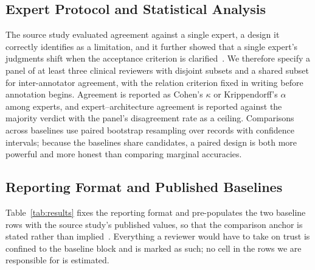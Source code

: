\documentclass[conference]{IEEEtran}
\begin{document}
\subsection{Expert Protocol and Statistical Analysis}

The source study evaluated agreement against a single expert, a design it correctly identifies as a limitation, and it further showed that a single expert's judgments shift when the acceptance criterion is clarified~\cite{b1}. We therefore specify a panel of at least three clinical reviewers with disjoint subsets and a shared subset for inter-annotator agreement, with the relation criterion fixed in writing before annotation begins. Agreement is reported as Cohen's $\kappa$ or Krippendorff's $\alpha$ among experts, and expert--architecture agreement is reported against the majority verdict with the panel's disagreement rate as a ceiling. Comparisons across baselines use paired bootstrap resampling over records with confidence intervals; because the baselines share candidates, a paired design is both more powerful and more honest than comparing marginal accuracies.

\subsection{Reporting Format and Published Baselines}

Table~\ref{tab:results} fixes the reporting format and pre-populates the two baseline rows with the source study's published values, so that the comparison anchor is stated rather than implied~\cite{b1}. Everything a reviewer would have to take on trust is confined to the baseline block and is marked as such; no cell in the rows we are responsible for is estimated.
\end{document}

